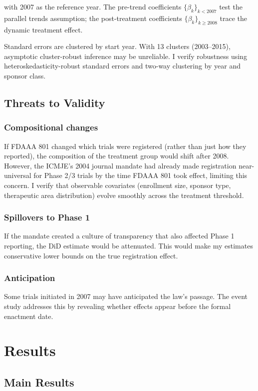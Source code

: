 \documentclass[12pt]{article}
\begin{document}
with 2007 as the reference year. The pre-trend coefficients $\{\beta_k\}_{k < 2007}$ test the parallel trends assumption; the post-treatment coefficients $\{\beta_k\}_{k \geq 2008}$ trace the dynamic treatment effect.

Standard errors are clustered by start year. With 13 clusters (2003--2015), asymptotic cluster-robust inference may be unreliable. I verify robustness using heteroskedasticity-robust standard errors and two-way clustering by year and sponsor class.

\subsection{Threats to Validity}

\subsubsection*{Compositional changes} If FDAAA 801 changed which trials were registered (rather than just how they reported), the composition of the treatment group would shift after 2008. However, the ICMJE's 2004 journal mandate had already made registration near-universal for Phase 2/3 trials by the time FDAAA 801 took effect, limiting this concern. I verify that observable covariates (enrollment size, sponsor type, therapeutic area distribution) evolve smoothly across the treatment threshold.

\subsubsection*{Spillovers to Phase 1} If the mandate created a culture of transparency that also affected Phase 1 reporting, the DiD estimate would be attenuated. This would make my estimates conservative lower bounds on the true registration effect.

\subsubsection*{Anticipation} Some trials initiated in 2007 may have anticipated the law's passage. The event study addresses this by revealing whether effects appear before the formal enactment date.

\section{Results}

\subsection{Main Results}
\end{document}
